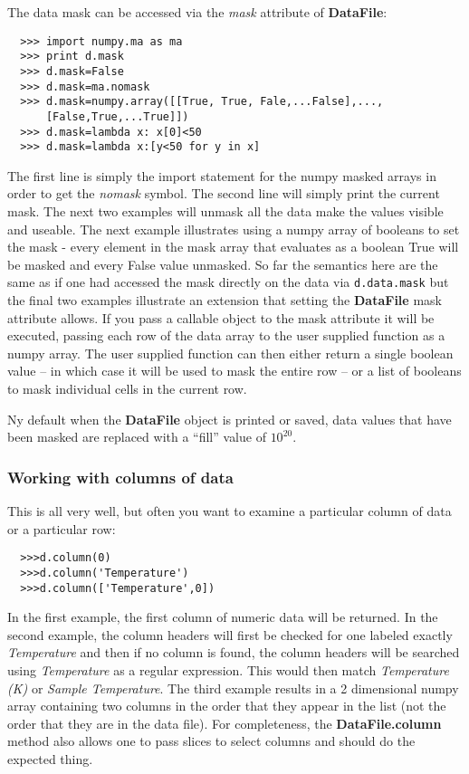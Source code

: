 \documentclass[a4paper,11pt]{scrartcl}
\begin{document}
The data mask can be accessed via the \textit{mask} attribute of \textbf{DataFile}:
\begin{verbatim}
  >>> import numpy.ma as ma
  >>> print d.mask
  >>> d.mask=False
  >>> d.mask=ma.nomask
  >>> d.mask=numpy.array([[True, True, Fale,...False],...,
      [False,True,...True]])
  >>> d.mask=lambda x: x[0]<50
  >>> d.mask=lambda x:[y<50 for y in x]
\end{verbatim}

The first line is simply the import statement for the numpy masked arrays in order to get the \textit{nomask} symbol. The second line will simply print the current mask. The next two examples will unmask all the data \ie make the values visible and useable. The next example illustrates using a numpy array of booleans to set the mask - every element in the mask array that evaluates as a boolean True will be masked and every False value unmasked. So far the semantics here are the same as if one had accessed the mask directly on the data via \verb'd.data.mask' but the final two examples illustrate an extension that setting the \textbf{DataFile} mask attribute allows. If you pass a callable object to the mask attribute it will be executed, passing each row of the data array to the user supplied function as a numpy array. The user supplied function can then either return a single boolean value -- in which case it will be used to mask the entire row -- or a list of booleans to mask individual cells in the current row.

Ny default when the \textbf{DataFile} object is printed or saved, data values that have been masked are replaced with a ``fill'' value of $10^{20}$.


\subsubsection{Working with columns of data}

This is all very well, but often you want to examine a particular column of data
or a particular row:
\begin{verbatim}
  >>>d.column(0)
  >>>d.column('Temperature')
  >>>d.column(['Temperature',0])
\end{verbatim}
In the first example, the first column of numeric data will be returned. In the
second example, the column headers will first be checked for one labeled exactly
\textit{Temperature} and then if no column is found, the column headers will be
searched using \textit{Temperature} as a regular expression. This would then
match \textit{Temperature (K)} or \textit{Sample Temperature}.  The third
example results in a 2 dimensional numpy array containing two columns in the
order that they appear in the list (\ie not the order that they are in the data
file). For completeness, the \textbf{DataFile.column} method also allows one to
pass slices to select columns and should do the expected thing.
\end{document}
